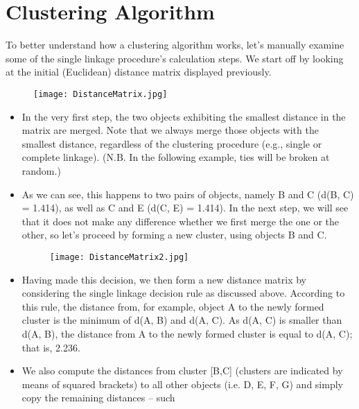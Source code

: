 \documentclass[a4paper,12pt]{article}
\begin{document}
\section{Clustering Algorithm}
To better understand how a clustering algorithm works, let’s manually examine
some of the single linkage procedure’s calculation steps. We start off by looking at
the initial (Euclidean) distance matrix displayed previously.

\begin{figure}[h!]
\begin{center}
  \texttt{[image: DistanceMatrix.jpg]}\\
\end{center}
\end{figure}

\begin{itemize}
\item In the very first step, the two
objects exhibiting the smallest distance in the matrix are merged. Note that we
always merge those objects with the smallest distance, regardless of the clustering
procedure (e.g., single or complete linkage). (N.B. In the following example, ties will be broken at random.)
\item As we can see, this happens to two
pairs of objects, namely B and C (d(B, C) = 1.414), as well as C and E (d(C, E) =
1.414). In the next step, we will see that it does not make any difference whether we
first merge the one or the other, so let’s proceed by forming a new cluster, using
objects B and C.
\begin{figure}[h!]
\begin{center}
  \texttt{[image: DistanceMatrix2.jpg]}\\
\end{center}
\end{figure}
\item Having made this decision, we then form a new distance matrix by considering
the single linkage decision rule as discussed above. According to this rule, the
distance from, for example, object A to the newly formed cluster is the minimum of
d(A, B) and d(A, C). As d(A, C) is smaller than d(A, B), the distance from A to the
newly formed cluster is equal to d(A, C); that is, 2.236.
\item We also compute the
distances from cluster [B,C] (clusters are indicated by means of squared brackets)
to all other objects (i.e. D, E, F, G) and simply copy the remaining distances – such

\end{itemize}
\end{document}
